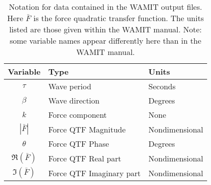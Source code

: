 
\begin{table}[H]
   \centering
   \caption[Notation for WAMIT output files]{Notation for data contained in the WAMIT output files.  Here $\bar{F}$ is the force quadratic transfer function. The units listed are those given within the WAMIT manual\cite{WAMIT}. Note: some variable names appear differently here than in the WAMIT manual.\label{tab:WamitOutputUnits}}
   \begin{tabular}{cll}
      \toprule
         Variable                   &  Type                       &  Units             \\
      \midrule
         $\tau$                     &  Wave period                &  Seconds           \\
         $\beta$                    &  Wave direction             &  Degrees           \\
         $k$                        &  Force component            &  None              \\
         $\left|\bar{F}\right|$     &  Force QTF Magnitude        &  Nondimensional    \\
         $\theta$                   &  Force QTF Phase            &  Degrees           \\
         $\Re(\bar{F})$             &  Force QTF Real part        &  Nondimensional    \\
         $\Im (\bar{F})$            &  Force QTF Imaginary part   &  Nondimensional    \\     
      \bottomrule
   \end{tabular}
\end{table}


